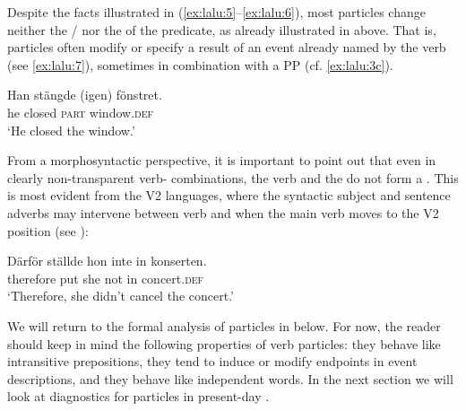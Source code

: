\documentclass[output=paper]{langscibook}
\begin{document}
\ea\label{ex:lalu:6}
\z
\z

Despite the facts illustrated in (\ref{ex:lalu:5}--\ref{ex:lalu:6}), most particles change neither the \slash {} nor the  of the predicate, as already illustrated in  above. That is, particles often modify or specify a result of an event already named by the verb (see \ref{ex:lalu:7}), sometimes in combination with a PP (cf. \ref{ex:lalu:3c}).


\ea\label{ex:lalu:7}
\gll  Han     stängde   (igen)   fönstret.\\
he       closed     \textsc{part}     window.\textsc{def}\\
\glt `He closed the window.'
\z

From a morphosyntactic perspective, it is important to point out that even in clearly non-transparent verb- combinations, the verb and the  do not form a . This is most evident from the  V2 languages, where the syntactic subject and sentence adverbs may intervene between verb and  when the main verb moves to the V2 position (see \citealt{Afarli1985}):


\ea\label{ex:lalu:8}
\gll  Därför   ställde   hon     inte     in   konserten.\\
therefore  put   she   not     in     concert.\textsc{def}\\
\glt `Therefore, she didn’t cancel the concert.'
\z


We will return to the formal analysis of particles in  below. For now, the reader should keep in mind the following properties of verb particles: they behave like intransitive prepositions, they tend to induce or modify endpoints in event descriptions, and they behave like independent words. In the next section we will look at diagnostics for particles in present-day .
\end{document}
